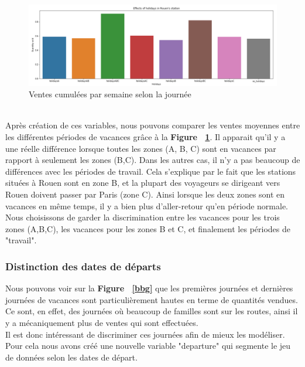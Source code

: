 \documentclass{article} %
\begin{document}
\begin{figure}[!h]
	\centering
	\includegraphics[keepaspectratio = true,scale=0.65]{saleholiday.png}
	\caption{Ventes cumulées par semaine selon la journée}
	\label{fig:salehol}
\end{figure}
~\\
Après création de ces variables, nous pouvons comparer les ventes moyennes entre les différentes périodes de vacances grâce à la \textbf{Figure ~\ref{fig:salehol}}. Il apparait qu'il y a une réelle différence lorsque toutes les zones (A, B, C) sont en vacances par rapport à seulement les zones (B,C). Dans les autres cas, il n'y a pas beaucoup de différences avec les périodes de travail. Cela s'explique par le fait que les stations situées à Rouen sont en zone B, et la plupart des voyageurs se dirigeant vers Rouen doivent passer par Paris (zone C). Ainsi lorsque les deux zones sont en vacances en même temps, il y a bien plus d'aller-retour qu'en période normale. Nous choisissons de garder la discrimination entre les vacances pour les trois zones (A,B,C), les vacances pour les zones B et C, et finalement les périodes de "travail".
\subsubsection{Distinction des dates de départs}
Nous pouvons voir sur la \textbf{Figure ~\ref{bbg}} que les premières journées et dernières journées de vacances sont particulièrement hautes en terme de quantités vendues. Ce sont, en effet, des journées où beaucoup de familles sont sur les routes, ainsi il y a mécaniquement plus de ventes qui sont effectuées.\\
Il est donc intéressant de discriminer ces journées afin de mieux les modéliser. Pour cela nous avons créé une nouvelle variable "departure"  qui segmente le jeu de données selon les dates de départ.
\end{document}
